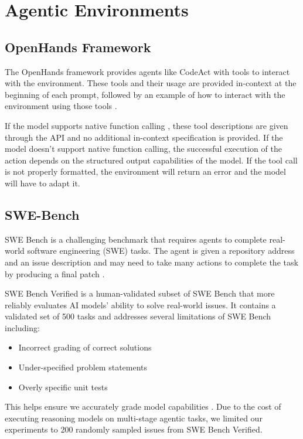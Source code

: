 \section{Agentic Environments}
\label{sec:agentic}

\subsection{OpenHands Framework}
The OpenHands framework provides agents like CodeAct \cite{wang2024executablecodeactionselicit} with tools to interact with the environment. These tools and their usage are provided in-context at the beginning of each prompt, followed by an example of how to interact with the environment using those tools \cite{wang2024openhandsopenplatformai}. 

If the model supports native function calling \cite{openai_function_calling}, these tool descriptions are given through the API and no additional in-context specification is provided. If the model doesn't support native function calling, the successful execution of the action depends on the structured output capabilities of the model. If the tool call is not properly formatted, the environment will return an error and the model will have to adapt it.

\subsection{SWE-Bench}
SWE Bench is a challenging benchmark that requires agents to complete real-world software engineering (SWE) tasks. The agent is given a repository address and an issue description and may need to take many actions to complete the task by producing a final patch \cite{jimenez2024swebenchlanguagemodelsresolve}.

SWE Bench Verified \cite{swebench_verified} is a human-validated subset of SWE Bench \cite{jimenez2024swebenchlanguagemodelsresolve} that more reliably evaluates AI models' ability to solve real-world issues. It contains a validated set of 500 tasks and addresses several limitations of SWE Bench including:
\begin{itemize}
    \item Incorrect grading of correct solutions
    \item Under-specified problem statements
    \item Overly specific unit tests
\end{itemize}

This helps ensure we accurately grade model capabilities \cite{openai_o1_system_card_2024, swebench_verified}. Due to the cost of executing reasoning models \cite{openai_pricing} on multi-stage agentic tasks, we limited our experiments to 200 randomly sampled issues from SWE Bench Verified.

